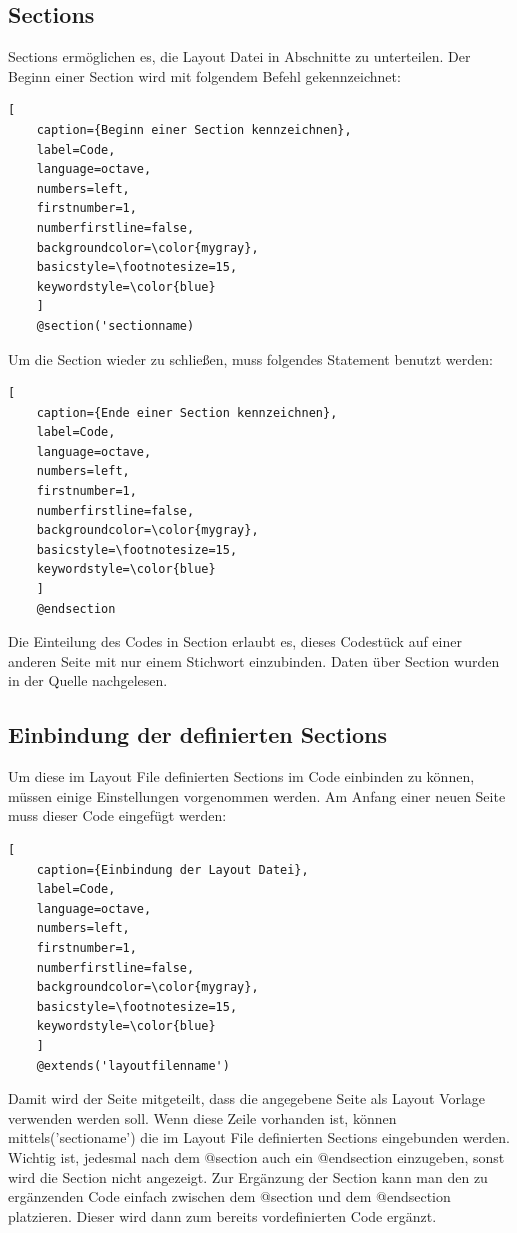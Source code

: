 \subsection{Sections}
Sections ermöglichen es, die Layout Datei in Abschnitte zu unterteilen. Der Beginn einer Section wird mit folgendem Befehl gekennzeichnet:
\begin{lstlisting}[
	caption={Beginn einer Section kennzeichnen},
	label=Code,
	language=octave,
	numbers=left,
	firstnumber=1,
	numberfirstline=false,
	backgroundcolor=\color{mygray},
	basicstyle=\footnotesize=15,
	keywordstyle=\color{blue}
	]
	@section('sectionname)
\end{lstlisting} 
Um die Section wieder zu schließen, muss folgendes Statement benutzt werden: 
\begin{lstlisting}[
	caption={Ende einer Section kennzeichnen},
	label=Code,
	language=octave,
	numbers=left,
	firstnumber=1,
	numberfirstline=false,
	backgroundcolor=\color{mygray},
	basicstyle=\footnotesize=15,
	keywordstyle=\color{blue}
	]
	@endsection
\end{lstlisting} 
 Die Einteilung des Codes in Section erlaubt es, dieses Codestück auf einer anderen Seite mit nur einem Stichwort einzubinden. Daten über Section wurden in der Quelle \cite{yield} nachgelesen.
\subsection{Einbindung der definierten Sections}
Um diese im Layout File definierten Sections im Code einbinden zu können, müssen einige Einstellungen vorgenommen werden. Am Anfang einer neuen Seite muss dieser Code eingefügt werden:
\begin{lstlisting}[
	caption={Einbindung der Layout Datei},
	label=Code,
	language=octave,
	numbers=left,
	firstnumber=1,
	numberfirstline=false,
	backgroundcolor=\color{mygray},
	basicstyle=\footnotesize=15,
	keywordstyle=\color{blue}
	]
	@extends('layoutfilenname')
\end{lstlisting} 


Damit wird der Seite mitgeteilt, dass die angegebene Seite als Layout Vorlage verwenden werden soll. Wenn diese Zeile vorhanden ist, können mittels\@section('sectioname') die im Layout File definierten Sections eingebunden werden. Wichtig ist,  jedesmal nach dem @section auch ein @endsection einzugeben, sonst wird die Section nicht angezeigt. Zur Ergänzung der Section kann man den zu ergänzenden Code einfach zwischen dem @section und dem @endsection platzieren. Dieser wird dann zum bereits vordefinierten Code ergänzt.
\newpage
